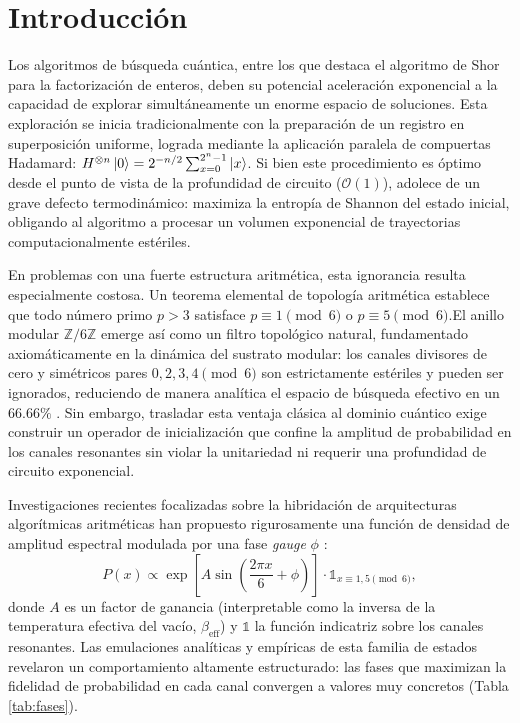 \documentclass[12pt,a4paper]{article}
\theoremstyle{plain}
\theoremstyle{definition}
\theoremstyle{remark}
\begin{document}
\tableofcontents
\newpage

\section{Introducción}

Los algoritmos de búsqueda cuántica, entre los que destaca el algoritmo de Shor para la factorización de enteros\cite{Shor1994}, deben su potencial aceleración exponencial a la capacidad de explorar simultáneamente un enorme espacio de soluciones. Esta exploración se inicia tradicionalmente con la preparación de un registro en superposición uniforme, lograda mediante la aplicación paralela de compuertas Hadamard: $H^{\otimes n}\ket{0} = 2^{-n/2}\sum_{x=0}^{2^n-1}\ket{x}$. Si bien este procedimiento es óptimo desde el punto de vista de la profundidad de circuito ($\mathcal{O}(1)$), adolece de un grave defecto termodinámico: maximiza la entropía de Shannon del estado inicial, obligando al algoritmo a procesar un volumen exponencial de trayectorias computacionalmente estériles.

En problemas con una fuerte estructura aritmética, esta ignorancia resulta especialmente costosa. Un teorema elemental de topología aritmética establece que todo número primo $p>3$ satisface $p \equiv 1 \pmod 6$ o $p \equiv 5 \pmod 6$.El anillo modular $\mathbb{Z}/6\mathbb{Z}$ emerge así como un filtro topológico natural, fundamentado axiomáticamente en la dinámica del sustrato modular: los canales divisores de cero y simétricos pares $0,2,3,4 \pmod 6$ son estrictamente estériles y pueden ser ignorados, reduciendo de manera analítica el espacio de búsqueda efectivo en un $66.66\%$ \cite{Peinador_Modular_Substrate_2025, Peinador_Emergencia_Geometria_2025}. Sin embargo, trasladar esta ventaja clásica al dominio cuántico exige construir un operador de inicialización que confine la amplitud de probabilidad en los canales resonantes sin violar la unitariedad ni requerir una profundidad de circuito exponencial.

Investigaciones recientes focalizadas sobre la hibridación de arquitecturas algorítmicas aritméticas han propuesto rigurosamente una función de densidad de amplitud espectral modulada por una fase \textit{gauge} $\phi$ \cite{Peinador_Isomorfismo_DSP_2025}:
\begin{equation}
P(x) \propto \exp\left[A \sin\left(\frac{2\pi x}{6} + \phi\right)\right] \cdot \mathds{1}_{x\equiv 1,5 \pmod{6}},
\label{eq:amplitud}
\end{equation}
donde $A$ es un factor de ganancia (interpretable como la inversa de la temperatura efectiva del vacío, $\beta_{\text{eff}}$) y $\mathds{1}$ la función indicatriz sobre los canales resonantes. Las emulaciones analíticas y empíricas de esta familia de estados revelaron un comportamiento altamente estructurado: las fases que maximizan la fidelidad de probabilidad en cada canal convergen a valores muy concretos (Tabla \ref{tab:fases}).
\end{document}
